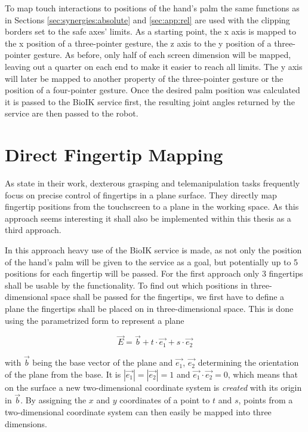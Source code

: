 To map touch interactions to positions of the hand's palm the same functions as in Sections \ref{sec:synergies:absolute} and \ref{sec:app:rel} are used with the clipping borders set to the safe axes' limits. As a starting point, the x axis is mapped to the x position of a three-pointer gesture, the z axis to the y position of a three-pointer gesture. As before, only half of each screen dimension will be mapped, leaving out a quarter on each end to make it easier to reach all limits. The y axis will later be mapped to another property of the three-pointer gesture or the position of a four-pointer gesture. Once the desired palm position was calculated it is passed to the BioIK service first, the resulting joint angles returned by the service are then passed to the robot.

\section{Direct Fingertip Mapping}

As \citeauthor{conf:humanoids:TohHLBZP12} state in their work, dexterous grasping and telemanipulation tasks frequently focus on precise control of fingertips in a plane surface\cite{conf:humanoids:TohHLBZP12}. They directly map fingertip positions from the touchscreen to a plane in the working space. As this approach seems interesting it shall also be implemented within this thesis as a third approach.

In this approach heavy use of the BioIK service is made, as not only the position of the hand's palm will be given to the service as a goal, but potentially up to 5 positions for each fingertip will be passed. For the first approach only 3 fingertips shall be usable by the functionality. To find out which positions in three-dimensional space shall be passed for the fingertips, we first have to define a plane the fingertips shall be placed on in three-dimensional space. This is done using the parametrized form to represent a plane 

\begin{equation*}
\vec{E} = \vec{b} + t\cdot \vec{e_1} + s \cdot \vec{e_2}
\end{equation*}

with $\vec{b}$ being the base vector of the plane and $\vec{e_1}$, $\vec{e_2}$ determining the orientation of the plane from the base. It is $|\vec{e_1}| = |\vec{e_2}| = 1$ and $\vec{e_1} \cdot \vec{e_2} = 0$, which means that on the surface a new two-dimensional coordinate system is \textit{created} with its origin in $\vec{b}$. By assigning the $x$ and $y$ coordinates of a point to $t$ and $s$, points from a two-dimensional coordinate system can then easily be mapped into three dimensions.

